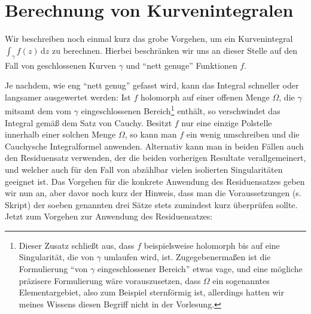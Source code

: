 \documentclass{article}
\theoremstyle{plain}
\theoremstyle{definition}
\begin{document}
\section{Berechnung von Kurvenintegralen}

Wir beschreiben noch einmal kurz das grobe Vorgehen, um ein Kurvenintegral $\int_{\gamma} f(z) \,\mathrm{d}z$ zu berechnen.
Hierbei beschränken wir uns an dieser Stelle auf den Fall von geschlossenen Kurven $\gamma$ und \enquote{nett genuge} Funktionen $f$.

Je nachdem, wie eng \enquote{nett genug} gefasst wird, kann das Integral schneller oder langsamer ausgewertet werden:
Ist $f$ holomorph auf einer offenen Menge $\Omega$, die $\gamma$ mitsamt dem vom $\gamma$ eingeschlossenen Bereich\footnote{Dieser Zusatz schließt aus, dass $f$ beispielsweise holomorph bis auf eine Singularität, die von $\gamma$ umlaufen wird, ist. Zugegebenermaßen ist die Formulierung \enquote{von $\gamma$ eingeschlossener Bereich} etwas vage, und eine mögliche präzisere Formulierung wäre vorauszusetzen, dass $\Omega$ ein sogenanntes Elementargebiet, also zum Beispiel sternförmig ist, allerdings hatten wir meines Wissens diesen Begriff nicht in der Vorlesung.} enthält, so verschwindet das Integral gemäß dem Satz von Cauchy.
Besitzt $f$ nur eine einzige Polstelle innerhalb einer solchen Menge $\Omega$, so kann man $f$ ein wenig umschreiben und die Cauchysche Integralformel anwenden.
Alternativ kann man in beiden Fällen auch den Residuensatz verwenden, der die beiden vorherigen Resultate verallgemeinert, und welcher auch für den Fall von abzählbar vielen isolierten Singularitäten geeignet ist.
Das Vorgehen für die konkrete Anwendung des Residuensatzes geben wir nun an, aber davor noch kurz der Hinweis, dass man die Voraussetzungen (s. Skript) der soeben genannten drei Sätze stets zumindest kurz überprüfen sollte.
Jetzt zum Vorgehen zur Anwendung des Residuensatzes:
\end{document}
